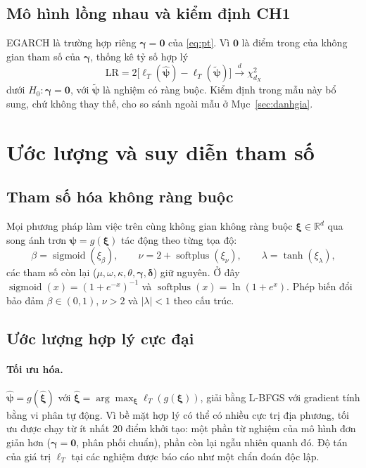 \documentclass[12pt,a4paper]{article}
\theoremstyle{definition}
\theoremstyle{remark}
\newcommand{\bpsi}{\boldsymbol{\psi}}
\newcommand{\bxi}{\boldsymbol{\xi}}
\newcommand{\bgamma}{\boldsymbol{\gamma}}
\newcommand{\bdelta}{\boldsymbol{\delta}}
\begin{document}
\subsection{Mô hình lồng nhau và kiểm định CH1}

EGARCH là trường hợp riêng $\bgamma=\mathbf 0$ của \eqref{eq:pt}. Vì $\mathbf 0$ là điểm trong của không gian tham số của $\bgamma$, thống kê tỷ số hợp lý
\begin{equation}
\mathrm{LR}=2\big[\ell_T(\hat{\bpsi})-\ell_T(\tilde{\bpsi})\big]\xrightarrow{d}\chi^2_{d_X}
\end{equation}
dưới $H_0:\bgamma=\mathbf 0$, với $\tilde{\bpsi}$ là nghiệm có ràng buộc. Kiểm định trong mẫu này bổ sung, chứ không thay thế, cho so sánh ngoài mẫu ở Mục~\ref{sec:danhgia}.

\section{Ước lượng và suy diễn tham số}\label{sec:uocluong}

\subsection{Tham số hóa không ràng buộc}

Mọi phương pháp làm việc trên cùng không gian không ràng buộc $\bxi\in\mathbb R^{d}$ qua song ánh trơn $\bpsi=g(\bxi)$ tác động theo từng tọa độ:
\begin{equation}\label{eq:reparam}
\beta=\operatorname{sigmoid}(\xi_\beta),\qquad \nu=2+\operatorname{softplus}(\xi_\nu),\qquad \lambda=\tanh(\xi_\lambda),
\end{equation}
các tham số còn lại ($\mu,\omega,\kappa,\theta,\bgamma,\bdelta$) giữ nguyên. Ở đây $\operatorname{sigmoid}(x)=(1+e^{-x})^{-1}$ và $\operatorname{softplus}(x)=\ln(1+e^{x})$. Phép biến đổi bảo đảm $\beta\in(0,1)$, $\nu>2$ và $|\lambda|<1$ theo cấu trúc.

\subsection{Ước lượng hợp lý cực đại}

\paragraph{Tối ưu hóa.} $\hat{\bpsi}=g(\hat{\bxi})$ với $\hat{\bxi}=\arg\max_{\bxi}\ell_T(g(\bxi))$, giải bằng L-BFGS với gradient tính bằng vi phân tự động. Vì bề mặt hợp lý có thể có nhiều cực trị địa phương, tối ưu được chạy từ ít nhất $20$ điểm khởi tạo: một phần từ nghiệm của mô hình đơn giản hơn ($\bgamma=\mathbf 0$, phân phối chuẩn), phần còn lại ngẫu nhiên quanh đó. Độ tán của giá trị $\ell_T$ tại các nghiệm được báo cáo như một chẩn đoán độc lập.
\end{document}
